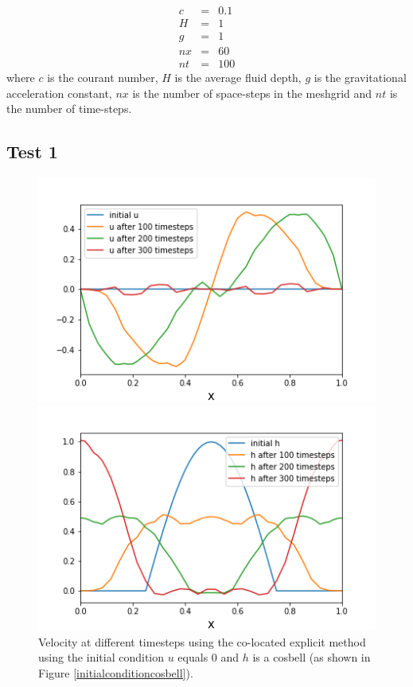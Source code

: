 \documentclass[a4paper,12pt, notitlepage]{article}
\begin{document}
\begin{eqnarray}
c & = & 0.1\\
H & = & 1\\
g & = & 1\\
nx & = & 60\\
nt & = & 100
\end{eqnarray}
where $c$ is the courant number, $H$ is the average fluid depth, $g$ is the gravitational acceleration constant, $nx$ is the number of space-steps in the meshgrid and $nt$ is the number of time-steps.
\subsection{Test 1}
\begin{figure} [H]
	\begin{minipage}{.5\textwidth}
		\ContinuedFloat*
		\captionsetup{width=0.9\textwidth}
		\captionsetup{justification=centering}
		\includegraphics[width=\textwidth]{velocity_colocated_explicit_cosbell.png}
		\caption{\label{velocity_colocated_explicit_cosbell} Velocity at different timesteps using the co-located explicit method using the initial condition $u$ equals $0$ and $h$ is a cosbell (as shown in Figure \ref{initialconditioncosbell}).} 
	\end{minipage}
	\begin{minipage}{.5\textwidth}
		\ContinuedFloat
		\captionsetup{width=0.9\textwidth}
		\captionsetup{justification=centering}
		\includegraphics[width=\textwidth]{height_colocated_explicit_cosbell.png}

\end{minipage}
\end{figure}
\end{document}
